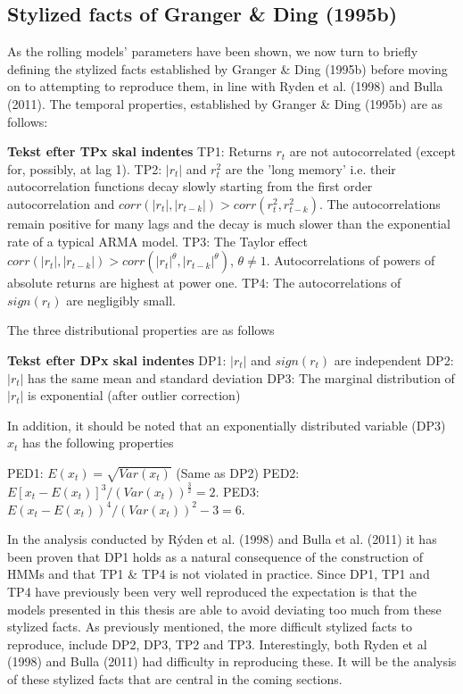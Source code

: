 \subsection{Stylized facts of Granger \& Ding (1995b)}
\label{section:stylized_facts_GD}

As the rolling models' parameters have been shown, we now turn to briefly defining the stylized facts established by Granger \& Ding (1995b) before moving on to attempting to reproduce them, in line with Ryden et al. (1998) and Bulla (2011). The temporal properties, established by Granger \& Ding (1995b) are as follows: 

\textbf{Tekst efter TPx skal indentes \newline}
TP1: Returns $r_t$ are not autocorrelated (except for, possibly, at lag 1). \newline
TP2: $|r_t|$ and $r_t^2$ are the 'long memory' i.e. their autocorrelation functions decay slowly starting from the first order autocorrelation and $corr(|r_t|, |r_{t-k}|) > corr(r_t^2, r^2_{t-k})$. The autocorrelations remain positive for many lags and the decay is much slower than the exponential rate of a typical ARMA model. \newline
TP3: The Taylor effect $corr(|r_t|, |r_{t-k}|) > corr(|r_t|^{\theta}, |r_{t-k}|^{\theta})$, $\theta \neq 1$. Autocorrelations of powers of absolute returns are highest at power one. \newline
TP4: The autocorrelations of $sign(r_t)$ are negligibly small.

The three distributional properties are as follows

\textbf{Tekst efter DPx skal indentes \newline}
DP1: $|r_t|$ and $sign(r_t)$ are independent\newline
DP2: $|r_t|$ has the same mean and standard deviation \newline
DP3: The marginal distribution of $|r_t|$ is exponential (after outlier correction)

In addition, it should be noted that an exponentially distributed variable (DP3) $x_t$ has the following properties

PED1: $E(x_t) = \sqrt{Var(x_t)}$ (Same as DP2) \newline
PED2: $E[x_t-E(x_t)]^3 / (Var(x_t))^{\frac{3}{2}} = 2.$ \newline
PED3: $E(x_t-E(x_t))^4 / (Var(x_t))^{2} -3 = 6.$

In the analysis conducted by Rýden et al. (1998) and Bulla et al. (2011) it has been proven that DP1 holds as a natural consequence of the construction of HMMs and that TP1 \& TP4 is not violated in practice. Since DP1, TP1 and TP4 have previously been very well reproduced the expectation is that the models presented in this thesis are able to avoid deviating too much from these stylized facts. As previously mentioned, the more difficult stylized facts to reproduce, include DP2, DP3, TP2 and TP3. Interestingly, both Ryden et al (1998) and Bulla (2011) had difficulty in reproducing these. It will be the analysis of these stylized facts that are central in the coming sections.

